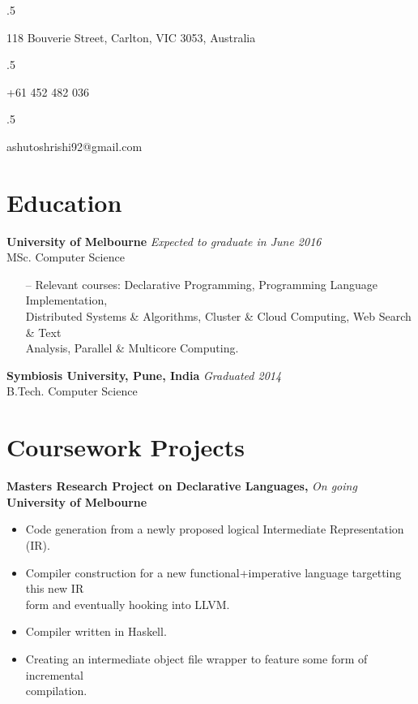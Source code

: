 \documentclass[a4paper,overlapped]{res}
\begin{document}


\begin{resume}
  \moveleft.5\hoffset\centerline{118 Bouverie Street, Carlton, VIC 3053, Australia}
  \moveleft.5\hoffset\centerline{+61 452 482 036}
  \moveleft.5\hoffset\centerline{ashutoshrishi92@gmail.com}

  \section{Education}  
  \textbf{University of Melbourne} \hfill \textit{Expected to graduate in June 2016} \\
  MSc. Computer Science 
  \begin{itemize} \itemsep -2pt
  \item[--] Relevant courses: Declarative Programming, 
    Programming Language Implementation, \\ Distributed Systems \&
    Algorithms, Cluster \& Cloud Computing, Web Search \& Text \\ 
    Analysis, Parallel \& Multicore Computing.
  \end{itemize}

  \textbf{Symbiosis University, Pune, India} \hfill \textit{Graduated 2014} \\
  B.Tech. Computer Science 


  \section{Coursework Projects}
  
  \textbf{Masters Research Project on Declarative Languages,} \hfill \textit{On going}\\
  \textbf{University of Melbourne}
  \begin{itemize}
  \item Code generation from a newly proposed logical Intermediate Representation (IR).
  \item Compiler construction for a new functional+imperative language
    targetting this new IR \\ form and eventually hooking into LLVM.
  \item Compiler written in Haskell.
  \item Creating an intermediate object file wrapper to feature some form of incremental\\
    compilation.

  \end{itemize}


\end{resume}
\end{document}
